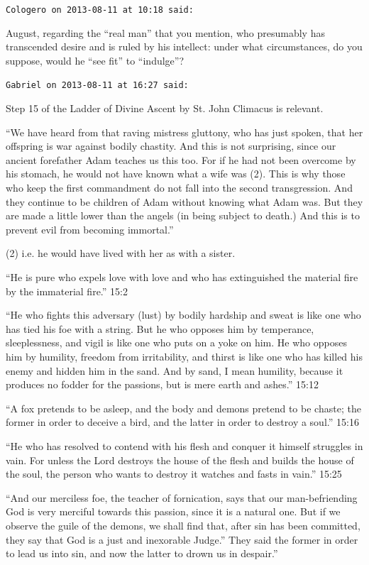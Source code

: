 \begin{footnotesize}
\begin{sffamily}
\hfill

\texttt{Cologero on 2013-08-11 at 10:18 said:}

August, regarding the ``real man'' that you mention, who presumably has transcended desire and is ruled by his intellect: under what circumstances, do you suppose, would he ``see fit'' to ``indulge''?

\hfill

\texttt{Gabriel on 2013-08-11 at 16:27 said:}

Step 15 of the Ladder of Divine Ascent by St. John Climacus is relevant.

``We have heard from that raving mistress gluttony, who has just spoken, that her offspring is war against bodily chastity. And this is not surprising, since our ancient forefather Adam teaches us this too. For if he had not been overcome by his stomach, he would not have known what a wife was (2). This is why those who keep the first commandment do not fall into the second transgression. And they continue to be children of Adam without knowing what Adam was. But they are made a little lower than the angels (in being subject to death.) And this is to prevent evil from becoming immortal.''

(2) i.e. he would have lived with her as with a sister.

``He is pure who expels love with love and who has extinguished the material fire by the immaterial fire.'' 15:2

``He who fights this adversary (lust) by bodily hardship and sweat is like one who has tied his foe with a string. But he who opposes him by temperance, sleeplessness, and vigil is like one who puts on a yoke on him. He who opposes him by humility, freedom from irritability, and thirst is like one who has killed his enemy and hidden him in the sand. And by sand, I mean humility, because it produces no fodder for the passions, but is mere earth and ashes.'' 15:12

``A fox pretends to be asleep, and the body and demons pretend to be chaste; the former in order to deceive a bird, and the latter in order to destroy a soul.'' 15:16

``He who has resolved to contend with his flesh and conquer it himself struggles in vain. For unless the Lord destroys the house of the flesh and builds the house of the soul, the person who wants to destroy it watches and fasts in vain.'' 15:25

``And our merciless foe, the teacher of fornication, says that our man-befriending God is very merciful towards this passion, since it is a natural one. But if we observe the guile of the demons, we shall find that, after sin has been committed, they say that God is a just and inexorable Judge.'' They said the former in order to lead us into sin, and now the latter to drown us in despair.''


\end{sffamily}
\end{footnotesize}
